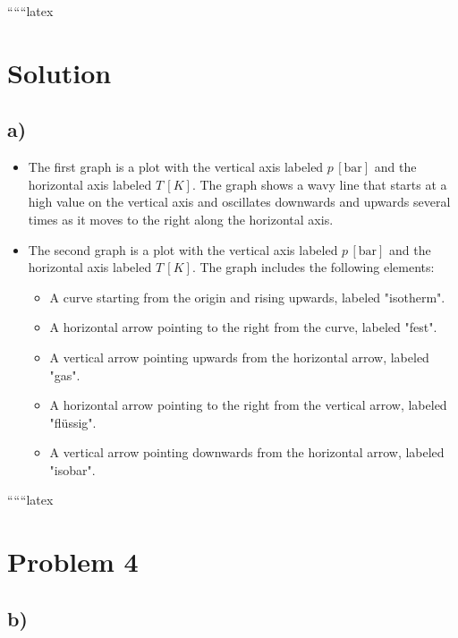 
``````latex


\section*{Solution}

\subsection*{a)}

\begin{itemize}
    \item The first graph is a plot with the vertical axis labeled \( p \, [\text{bar}] \) and the horizontal axis labeled \( T \, [K] \). The graph shows a wavy line that starts at a high value on the vertical axis and oscillates downwards and upwards several times as it moves to the right along the horizontal axis.
\end{itemize}

\begin{itemize}
    \item The second graph is a plot with the vertical axis labeled \( p \, [\text{bar}] \) and the horizontal axis labeled \( T \, [K] \). The graph includes the following elements:
    \begin{itemize}
        \item A curve starting from the origin and rising upwards, labeled "isotherm".
        \item A horizontal arrow pointing to the right from the curve, labeled "fest".
        \item A vertical arrow pointing upwards from the horizontal arrow, labeled "gas".
        \item A horizontal arrow pointing to the right from the vertical arrow, labeled "flüssig".
        \item A vertical arrow pointing downwards from the horizontal arrow, labeled "isobar".
    \end{itemize}
\end{itemize}

``````latex


\section*{Problem 4}

\subsection*{b)}

